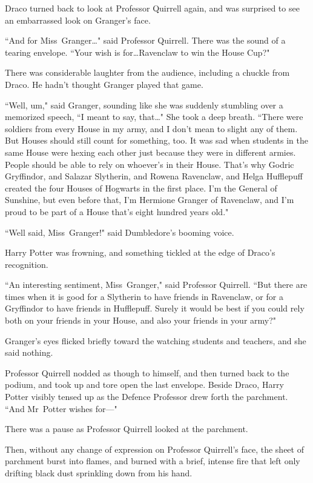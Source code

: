 Draco turned back to look at Professor Quirrell again, and was surprised to see an embarrassed look on Granger's face.

``And for Miss~Granger…" said Professor Quirrell. There was the sound of a tearing envelope. ``Your wish is for…Ravenclaw to win the House Cup?"

There was considerable laughter from the audience, including a chuckle from Draco. He hadn't thought Granger played that game.

``Well, um," said Granger, sounding like she was suddenly stumbling over a memorized speech, ``I meant to say, that…" She took a deep breath. ``There were soldiers from every House in my army, and I don't mean to slight any of them. But Houses should still count for something, too. It was sad when students in the same House were hexing each other just because they were in different armies. People should be able to rely on whoever's in their House. That's why Godric Gryffindor, and Salazar Slytherin, and Rowena Ravenclaw, and Helga Hufflepuff created the four Houses of Hogwarts in the first place. I'm the General of Sunshine, but even before that, I'm Hermione Granger of Ravenclaw, and I'm proud to be part of a House that's eight hundred years old."

``Well said, Miss~Granger!" said Dumbledore's booming voice.

Harry Potter was frowning, and something tickled at the edge of Draco's recognition.

``An interesting sentiment, Miss~Granger," said Professor Quirrell. ``But there are times when it is good for a Slytherin to have friends in Ravenclaw, or for a Gryffindor to have friends in Hufflepuff. Surely it would be best if you could rely both on your friends in your House, and also your friends in your army?"

Granger's eyes flicked briefly toward the watching students and teachers, and she said nothing.

Professor Quirrell nodded as though to himself, and then turned back to the podium, and took up and tore open the last envelope. Beside Draco, Harry Potter visibly tensed up as the Defence Professor drew forth the parchment. ``And Mr~Potter wishes for—"

There was a pause as Professor Quirrell looked at the parchment.

Then, without any change of expression on Professor Quirrell's face, the sheet of parchment burst into flames, and burned with a brief, intense fire that left only drifting black dust sprinkling down from his hand.

